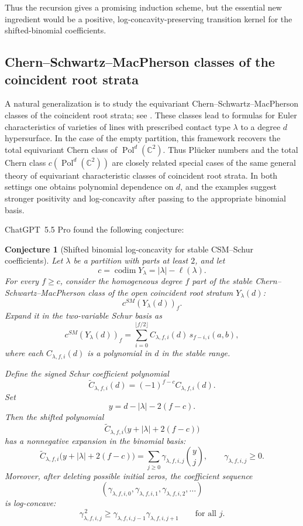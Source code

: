 \documentclass[11pt]{amsart}
\numberwithin{equation}{section}
\newtheorem{conjecture}[theorem]{Conjecture}
\theoremstyle{remark}
\DeclareMathOperator{\Pol}{Pol}
\begin{document}
Thus the recursion gives a promising induction scheme, but the essential
new ingredient would be a positive, log-concavity-preserving transition
kernel for the shifted-binomial coefficients.

\subsection{Chern--Schwartz--MacPherson classes of the coincident root strata}\label{subsec:csm-root-strata}

A natural generalization is to study the equivariant
Chern--Schwartz--MacPherson classes of the coincident root strata; see
\cite{juhasz-thesis}.  These classes lead to formulas for Euler
characteristics of varieties of lines with prescribed contact type
$\lambda$ to a degree $d$ hypersurface.  In the case of the empty
partition, this framework recovers the total equivariant Chern class of
$\Pol^d(\mathbb C^2)$.  Thus Pl\"ucker numbers and the total Chern class
$c(\Pol^d(\mathbb C^2))$ are closely related special cases of the same
general theory of equivariant characteristic classes of coincident root
strata.  In both settings one obtains polynomial dependence on $d$, and
the examples suggest stronger positivity and log-concavity after passing to
the appropriate binomial basis.

ChatGPT~5.5 Pro found the following conjecture:

\begin{conjecture}[Shifted binomial log-concavity for stable CSM--Schur coefficients]
Let $\lambda$ be a partition with parts at least $2$, and let
\[
c=\operatorname{codim}Y_\lambda=|\lambda|-\ell(\lambda).
\]
For every $f\ge c$, consider the homogeneous degree $f$ part of the stable
Chern--Schwartz--MacPherson class of the open coincident root stratum
$Y_\lambda(d)$:
\[
c^{SM}(Y_\lambda(d))_f.
\]
Expand it in the two-variable Schur basis as
\[
c^{SM}(Y_\lambda(d))_f
=
\sum_{i=0}^{\lfloor f/2\rfloor}
C_{\lambda,f,i}(d)\,s_{f-i,i}(a,b),
\]
where each $C_{\lambda,f,i}(d)$ is a polynomial in $d$ in the stable range.

Define the signed Schur coefficient polynomial
\[
\widetilde C_{\lambda,f,i}(d)
=
(-1)^{f-c}C_{\lambda,f,i}(d).
\]
Set
\[
y=d-|\lambda|-2(f-c).
\]
Then the shifted polynomial
\[
\widetilde C_{\lambda,f,i}\bigl(y+|\lambda|+2(f-c)\bigr)
\]
has a nonnegative expansion in the binomial basis:
\[
\widetilde C_{\lambda,f,i}\bigl(y+|\lambda|+2(f-c)\bigr)
=
\sum_{j\ge 0}
\gamma_{\lambda,f,i,j}\binom{y}{j},
\qquad
\gamma_{\lambda,f,i,j}\ge 0.
\]
Moreover, after deleting possible initial zeros, the coefficient sequence
\[
\left(\gamma_{\lambda,f,i,0},
\gamma_{\lambda,f,i,1},
\gamma_{\lambda,f,i,2},
\ldots
\right)
\]
is log-concave:
\[
\gamma_{\lambda,f,i,j}^{\,2}
\ge
\gamma_{\lambda,f,i,j-1}\gamma_{\lambda,f,i,j+1}
\qquad
\text{for all } j.
\]
\end{conjecture}
\end{document}
